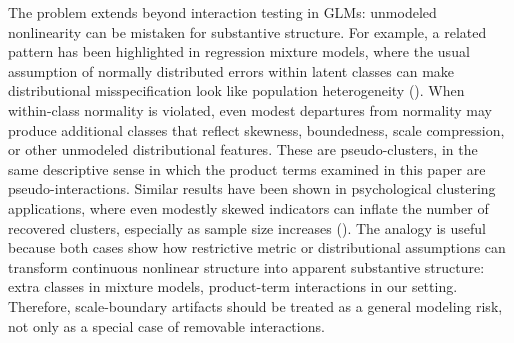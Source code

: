 \documentclass[
  man,
  longtable,
  nolmodern,
  notxfonts,
  notimes,
  colorlinks=true,linkcolor=blue,citecolor=blue,urlcolor=blue]{apa7}
\begin{document}
The problem extends beyond interaction testing in GLMs: unmodeled
nonlinearity can be mistaken for substantive structure. For example, a
related pattern has been highlighted in regression mixture models, where
the usual assumption of normally distributed errors within latent
classes can make distributional misspecification look like population
heterogeneity (). When
within-class normality is violated, even modest departures from
normality may produce additional classes that reflect skewness,
boundedness, scale compression, or other unmodeled distributional
features. These are pseudo-clusters, in the same descriptive sense in
which the product terms examined in this paper are pseudo-interactions.
Similar results have been shown in psychological clustering
applications, where even modestly skewed indicators can inflate the
number of recovered clusters, especially as sample size increases
(). The
analogy is useful because both cases show how restrictive metric or
distributional assumptions can transform continuous nonlinear structure
into apparent substantive structure: extra classes in mixture models,
product-term interactions in our setting. Therefore, scale-boundary
artifacts should be treated as a general modeling risk, not only as a
special case of removable interactions.
\end{document}
